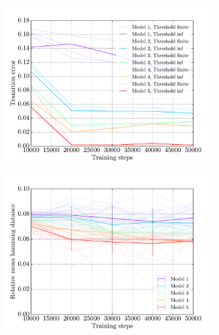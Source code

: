 \begin{figure}[!t]
    \centering
    \begin{subfigure}{0.48\textwidth}
    	\centering
        \includegraphics[width=\textwidth]{appendix/hamming_distances_training_steps_with_thresholds}
        \caption{}
        \label{fig:ham-thesholds}
    \end{subfigure}
    \hfill
    \begin{subfigure}{0.48\textwidth}
    	\centering
        \includegraphics[width=\textwidth]{appendix/hamming_distances_training_steps_hamming}
        \caption{}
        \label{fig:ham-training-hamming}
    \end{subfigure}

\end{figure}
